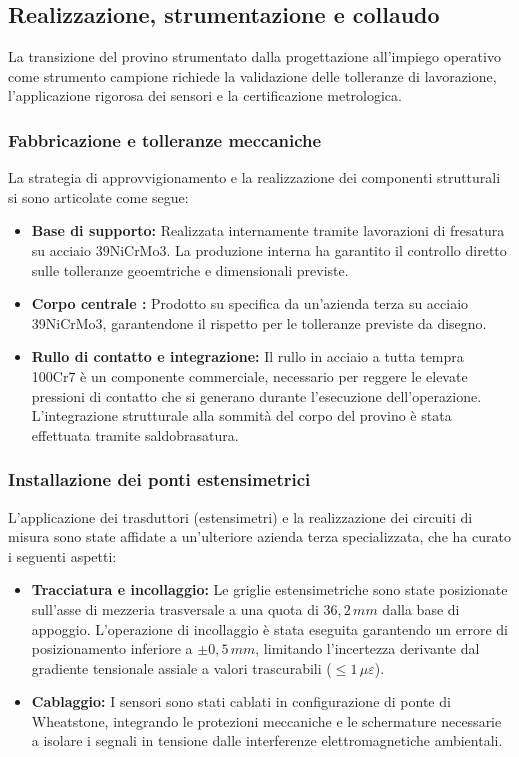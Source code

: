 \documentclass[a4paper, twoside]{article}
\begin{document}
\subsection{Realizzazione, strumentazione e collaudo}

La transizione del provino strumentato dalla progettazione all'impiego operativo come strumento campione richiede la validazione delle tolleranze di lavorazione, l'applicazione rigorosa dei sensori e la certificazione metrologica.

\subsubsection{Fabbricazione e tolleranze meccaniche}
La strategia di approvvigionamento e la realizzazione dei componenti strutturali si sono articolate come segue:

\begin{itemize}
    \item \textbf{Base di supporto:} Realizzata internamente tramite lavorazioni di fresatura su acciaio 39NiCrMo3. La produzione interna ha garantito il controllo diretto sulle tolleranze geoemtriche e dimensionali previste.
    \item \textbf{Corpo centrale :} Prodotto su specifica da un'azienda terza su acciaio 39NiCrMo3, garantendone il rispetto per le tolleranze previste da disegno.
    \item \textbf{Rullo di contatto e integrazione:} Il rullo in acciaio a tutta tempra 100Cr7 è un componente commerciale, necessario per reggere le elevate pressioni di contatto che si generano durante l'esecuzione dell'operazione. L'integrazione strutturale alla sommità del corpo del provino è stata effettuata tramite saldobrasatura.
\end{itemize}

\subsubsection{Installazione dei ponti estensimetrici}
L'applicazione dei trasduttori (estensimetri) e la realizzazione dei circuiti di misura sono state affidate a un'ulteriore azienda terza specializzata, che ha curato i seguenti aspetti:

\begin{itemize}
    \item \textbf{Tracciatura e incollaggio:} Le griglie estensimetriche sono state posizionate sull'asse di mezzeria trasversale a una quota di $36,2\,mm$ dalla base di appoggio. L'operazione di incollaggio è stata eseguita garantendo un errore di posizionamento inferiore a $\pm 0,5\,mm$, limitando l'incertezza derivante dal gradiente tensionale assiale a valori trascurabili ($\le 1\,\mu\varepsilon$).
    \item \textbf{Cablaggio:} I sensori sono stati cablati in configurazione di ponte di Wheatstone, integrando le protezioni meccaniche e le schermature necessarie a isolare i segnali in tensione dalle interferenze elettromagnetiche ambientali.
\end{itemize}
\end{document}

